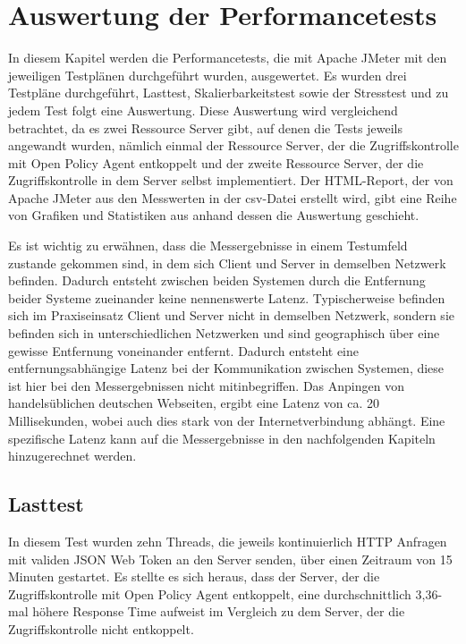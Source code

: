 \chapter{Auswertung der Performancetests}
\label{AuswertungderPerformancetests}
In diesem Kapitel werden die Performancetests, die mit Apache JMeter mit den jeweiligen Testplänen durchgeführt wurden, ausgewertet. Es wurden drei Testpläne durchgeführt, Lasttest, Skalierbarkeitstest sowie der Stresstest und zu jedem Test folgt eine Auswertung. Diese Auswertung wird vergleichend betrachtet, da es zwei Ressource Server gibt, auf denen die Tests jeweils angewandt wurden, nämlich einmal der Ressource Server, der die Zugriffskontrolle mit Open Policy Agent entkoppelt und der zweite Ressource Server, der die Zugriffskontrolle in dem Server selbst implementiert. Der HTML-Report, der von Apache JMeter aus den Messwerten in der csv-Datei erstellt wird, gibt eine Reihe von Grafiken und Statistiken aus anhand dessen die Auswertung geschieht.\smallskip

Es ist wichtig zu erwähnen, dass die Messergebnisse in einem Testumfeld zustande gekommen sind, in dem sich Client und Server in demselben Netzwerk befinden. Dadurch entsteht zwischen beiden Systemen durch die Entfernung beider Systeme zueinander keine nennenswerte Latenz. Typischerweise befinden sich im Praxiseinsatz Client und Server nicht in demselben Netzwerk, sondern sie befinden sich in unterschiedlichen Netzwerken und sind geographisch über eine gewisse Entfernung voneinander entfernt. Dadurch entsteht eine entfernungsabhängige Latenz bei der Kommunikation zwischen Systemen, diese ist hier bei den Messergebnissen nicht mitinbegriffen. Das Anpingen von handelsüblichen deutschen Webseiten, ergibt eine Latenz von ca. 20 Millisekunden, wobei auch dies stark von der Internetverbindung abhängt. Eine spezifische Latenz kann auf die Messergebnisse in den nachfolgenden Kapiteln hinzugerechnet werden.

\section{Lasttest}
In diesem Test wurden zehn Threads, die jeweils kontinuierlich HTTP Anfragen mit validen JSON Web Token an den Server senden, über einen Zeitraum von 15 Minuten gestartet. Es stellte es sich heraus, dass der Server, der die Zugriffskontrolle mit Open Policy Agent entkoppelt, eine durchschnittlich 3,36-mal höhere Response Time aufweist im Vergleich zu dem Server, der die Zugriffskontrolle nicht entkoppelt.\smallskip

